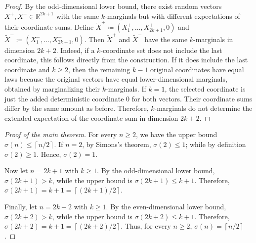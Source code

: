 \documentclass[11pt]{amsart}
\theoremstyle{plain}
\theoremstyle{definition}
\theoremstyle{remark}
\numberwithin{equation}{section}
\newcommand{\R}{\mathbb R}
\newcommand{\1}{\mathbf 1}
\begin{document}
\begin{proof}
By the odd-dimensional lower bound, there exist random vectors \(X^+,X^-\in\R^{2k+1}\) with the same \(k\)-marginals but with different expectations of their coordinate sums. Define \(\tilde X^+\coloneqq\left(X_1^+,\ldots,X_{2k+1}^+,0\right)\) and \(\tilde X^-\coloneqq\left(X_1^-,\ldots,X_{2k+1}^-,0\right)\). Then \(\tilde X^+\) and \(\tilde X^-\) have the same \(k\)-marginals in dimension \(2k+2\). Indeed, if a \(k\)-coordinate set does not include the last coordinate, this follows directly from the construction. If it does include the last coordinate and \(k\ge2\), then the remaining \(k-1\) original coordinates have equal laws because the original vectors have equal lower-dimensional marginals, obtained by marginalizing their \(k\)-marginals. If \(k=1\), the selected coordinate is just the added deterministic coordinate \(0\) for both vectors. Their coordinate sums differ by the same amount as before. Therefore, \(k\)-marginals do not determine the extended expectation of the coordinate sum in dimension \(2k+2\).
\end{proof}

\begin{proof}[Proof of the main theorem]
For every \(n\ge2\), we have the upper bound \(\sigma\left(n\right)\le\left\lceil n/2\right\rceil\). If \(n=2\), by Simons's theorem, \(\sigma\left(2\right)\le1\); while by definition \(\sigma\left(2\right)\ge1\). Hence, \(\sigma\left(2\right)=1\).

Now let \(n=2k+1\) with \(k\ge1\). By the odd-dimensional lower bound, \(\sigma\left(2k+1\right)>k\), while the upper bound is \(\sigma\left(2k+1\right)\le k+1\). Therefore, \(\sigma\left(2k+1\right)=k+1=\left\lceil\left(2k+1\right)/2\right\rceil\).

Finally, let \(n=2k+2\) with \(k\ge1\). By the even-dimensional lower bound, \(\sigma\left(2k+2\right)>k\), while the upper bound is \(\sigma\left(2k+2\right)\le k+1\). Therefore, \(\sigma\left(2k+2\right)=k+1=\left\lceil\left(2k+2\right)/2\right\rceil\). Thus, for every \(n\ge2\), \(\sigma\left(n\right)=\left\lceil n/2\right\rceil\).
\end{proof}



\end{document}
